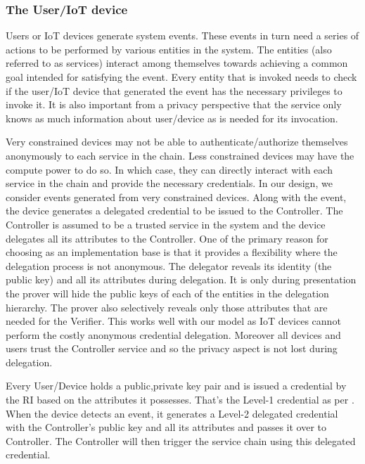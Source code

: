 \documentclass[journal]{IEEEtran}
\begin{document}
\subsubsection{The User/IoT device} \label{iotdevice}
Users or IoT devices generate system events. These events in turn need a series of actions to be performed by various entities in the system. The entities (also referred to as services) interact among themselves towards achieving a common goal intended for satisfying the event. Every entity that is invoked needs to check if the user/IoT device that generated the event has the necessary privileges to invoke it. It is also important from a privacy perspective that the service only knows as much information about user/device as is needed for its invocation. 

Very constrained devices may not be able to authenticate/authorize themselves anonymously to each service in the chain. Less constrained devices may have the compute power to do so. In which case, they can directly interact with each service in the chain and provide the necessary credentials. In our design, we consider events generated from very constrained devices. Along with the event, the device generates a delegated credential to be issued to the Controller. The Controller is assumed to be a trusted service in the system and the device delegates all its attributes to the Controller. One of the primary reason for choosing \citep{CamenischDD17} as an implementation base is that it provides a flexibility where the delegation process is not anonymous. The delegator reveals its identity (the public key) and all its attributes during delegation. It is only during presentation the prover will hide the public keys of each of the entities in the delegation hierarchy. The prover also selectively reveals only those attributes that are needed for the Verifier. This works well with our model as IoT devices cannot perform the costly anonymous credential delegation. Moreover all devices and users trust the Controller service and so the privacy aspect is not lost during delegation.

Every User/Device holds a public,private key pair and is issued a credential by the RI based on the attributes it possesses. That's the Level-1 credential as per \cite{CamenischDD17}. When the device detects an event, it generates a Level-2 delegated credential with the Controller's public key and all its attributes and passes it over to Controller. The Controller will then trigger the service chain using this delegated credential.
\end{document}
